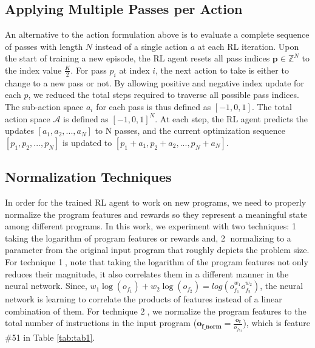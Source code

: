 \subsection{Applying Multiple Passes per Action}
\label{subsubsec:conf2}
An alternative to the action formulation above is to evaluate a complete sequence of passes with length $N$ instead of a single action $a$ at each RL iteration. Upon the start of training a new episode, the RL agent resets all pass indices $\mathbf{p} \in \mathbb{Z}^N$ to the index value $\frac{K}{2}$. For pass ${p_i}$ at index $i$, 
the next action to take is either to change to a new pass or not. 
By allowing positive and negative index update for each $p$, we reduced the total steps required to traverse all possible pass indices.  
The sub-action space $a_i$ for each pass is thus defined as $[-1, 0, 1]$.
The total action space $\mathcal{A}$ is defined as $[-1, 0, 1]^N$.
At each step, the RL agent predicts the updates $[a_1, a_2, ..., a_N]$ to N passes, and the current optimization sequence $[p_1, p_2, ..., p_N]$ is updated to $[p_1+a_1, p_2+a_2, ..., p_N+a_N]$.  %


\subsection{Normalization Techniques}
\label{subsection:norm}
In order for the trained RL agent to work on new programs, we need to properly normalize the program features and rewards so they represent a meaningful state among different programs. 
In this work, we experiment with two techniques: 
\textcircled{1} taking the logarithm of program features or rewards and,   
\textcircled{2} normalizing to a parameter from the original input program that roughly depicts the problem size. 
For technique \textcircled{1}, note that taking the logarithm of the program features not only reduces their magnitude, it also correlates them in a different manner in the neural network. Since, $w_1\log(o_{f_1}) + w_2\log(o_{f_2}) = log(o_{f_1}^{w_1}o_{f_2}^{w_2})$,
the neural network is learning to correlate the products of features instead of a linear combination of them.  
For technique \textcircled{2}, we normalize the program features to the total number of instructions in the input program ($\mathbf{o_{f\_norm}} =\frac{\mathbf{o_{f}}}{o_{f_{51}}}$), which is feature \#51 in Table \ref{tab:tab1}.
